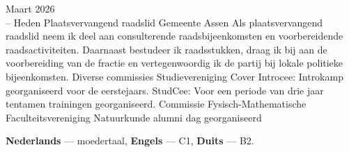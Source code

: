 \documentclass[9pt]{developercv} %
\begin{document}
\begin{entrylist}
    \entry
        {Maart 2026 \\ -- Heden}
        {Plaatsvervangend raadslid}
        {Gemeente Assen}
        {Als plaatsvervangend raadslid neem ik deel aan consulterende raadsbijeenkomsten en voorbereidende raadsactiviteiten. Daarnaast bestudeer ik raadsstukken, draag ik bij aan de voorbereiding van de fractie en vertegenwoordig ik de partij bij lokale politieke bijeenkomsten.}
    \entry
		{}
		{Diverse commissies}
		{Studievereniging Cover}
		{Introcee: Introkamp georganiseerd voor de eerstejaars. StudCee: Voor een periode van drie jaar tentamen trainingen georganiseerd.}
    \entry
		{}
		{Commissie}
		{Fysisch-Mathematische Faculteitsvereniging}
		{Natuurkunde alumni dag georganiseerd}
\end{entrylist}
\vspace{-10 pt}
    \vspace{-6pt}
    
    \hspace{26mm} \textbf{Nederlands} --- moedertaal, \textbf{Engels} --- C1, \textbf{Duits} --- B2.

\end{document}
